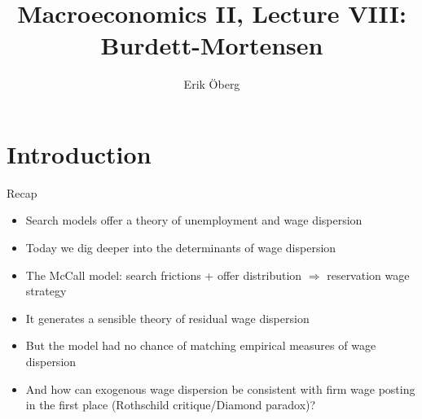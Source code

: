 \documentclass[9pt]{beamer}
\title[Job ladders and Wage Dispersion]{Macroeconomics II, Lecture VIII:\\
	 Burdett-Mortensen}
\author{Erik {\"O}berg}
\date{}
\newcommand{\bit}{\begin{itemize}}
\newcommand{\eit}{\end{itemize}}
\begin{document}
\begin{frame}[plain]
\titlepage
\end{frame}

\section{Introduction}



\begin{frame}{Recap}

\bit
	\setlength\itemsep{2em}
	
	\item Search models offer a theory of unemployment and wage dispersion
	
	\item Today we dig deeper into the determinants of wage dispersion

	\item The McCall model: search frictions + offer distribution $\Rightarrow$ reservation wage strategy

	\item It generates a sensible theory of residual wage dispersion

	
	\item But the model had no chance of matching empirical measures of wage dispersion
	
	\item And how can exogenous wage dispersion be consistent with firm wage posting in the first place (Rothschild critique/Diamond paradox)?
\eit

\end{frame}
\end{document}
